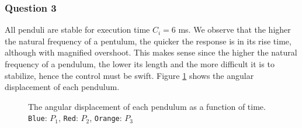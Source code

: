 \subsubsection{Question 3}

All penduli are stable for execution time $C_i = 6$ ms. We observe that the
higher the natural frequency of a pentulum, the quicker the response is in its
rise time, although with magnified overshoot. This makes sense since the higher
the natural frequency of a pendulum, the lower its length and the more difficult
it is to stabilize, hence the control must be swift. Figure \ref{fig:02.3} shows
the angular displacement of each pendulum.

\begin{figure}[H]\centering
  \scalebox{1}{}
  \caption{The angular displacement of each pendulum as a function of time.
    \texttt{Blue}: $P_1$, \texttt{Red}: $P_2$, \texttt{Orange}: $P_3$}
  \label{fig:02.3}
\end{figure}

